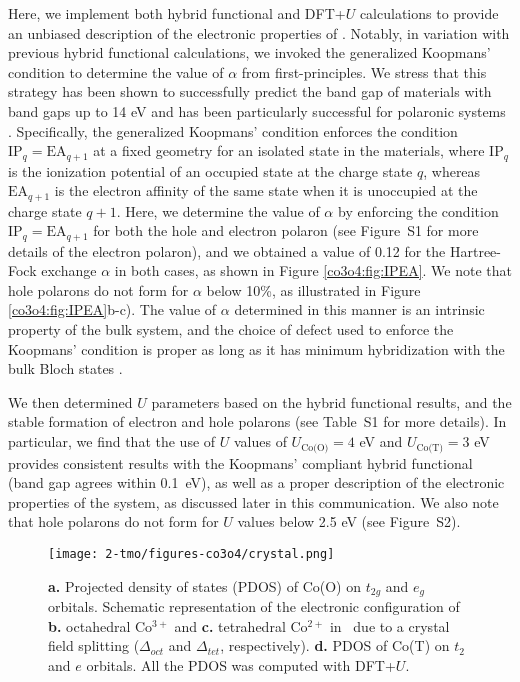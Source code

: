 Here, we implement both hybrid functional and DFT+$U$ calculations to provide an unbiased description of the electronic properties of \co. Notably, in variation with previous hybrid functional calculations, we invoked the generalized Koopmans' condition to determine the value of $\alpha$ from first-principles. We stress that this strategy has been shown to successfully predict the band gap of materials with band gaps up to 14 eV and has been particularly successful for polaronic systems \cite{miceli2018nonempirical,smart2018fundamental,liu2018electron,lany2011predicting}. Specifically, the generalized Koopmans' condition enforces the condition $\text{IP}_q=\text{EA}_{q+1}$ at a fixed geometry for an isolated state in the materials, where $\text{IP}_q$ is the ionization potential of an occupied state at the charge state $q$, whereas $\text{EA}_{q+1}$ is the electron affinity of the same state when it is unoccupied at the charge state $q+1$.  Here, we determine the value of $\alpha$ by enforcing the condition $\text{IP}_q=\text{EA}_{q+1}$ for both the hole and electron polaron (see Figure~S1 for more details of the electron polaron), and we obtained a value of 0.12 for the Hartree-Fock exchange $\alpha$ in both cases, as shown in Figure \ref{co3o4:fig:IPEA}. We note that hole polarons do not form for $\alpha$ below 10\%, as illustrated in Figure \ref{co3o4:fig:IPEA}b-c). The value of $\alpha$ determined in this manner is an intrinsic property of the bulk system, and the choice of defect used to enforce the Koopmans’ condition is proper as long as it has minimum hybridization with the bulk Bloch states \cite{bischoff2019adjustable,miceli2018nonempirical,smart2018fundamental}.

We then determined $U$ parameters based on the hybrid functional results, and the stable formation of electron and hole polarons (see Table~S1 for more details). In particular, we find that the use of $U$ values of $U_\text{Co(O)}=4$ eV and $U_\text{Co(T)}=3$ eV provides consistent results with the Koopmans' compliant hybrid functional (band gap agrees within 0.1~eV), as well as a proper description of the electronic properties of the system, as discussed later in this communication. We also note that hole polarons do not form for $U$ values below 2.5 eV (see Figure~S2).

\begin{figure}[t]
\begin{center}
\texttt{[image: 2-tmo/figures-co3o4/crystal.png]}
\caption{\textbf{a.} Projected density of states (PDOS) of Co(O) on $t_{2g}$ and $e_g$ orbitals. Schematic representation of the electronic configuration of \textbf{b.} octahedral Co$^{3+}$ and \textbf{c.} tetrahedral Co$^{2+}$ in \co\ due to a crystal field splitting ($\Delta_{oct}$ and $\Delta_{tet}$, respectively). \textbf{d.} PDOS of Co(T) on $t_2$ and $e$ orbitals. All the PDOS was computed with DFT+$U$.}
\label{co3o4:fig:split}
\end{center}
\end{figure}

